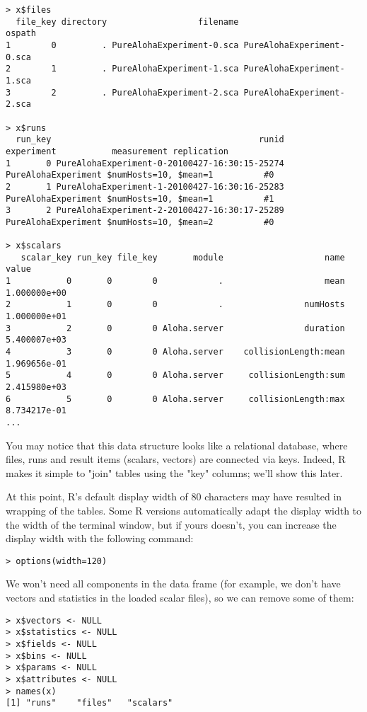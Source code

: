 \begin{verbatim}
> x$files
  file_key directory                  filename                    ospath
1        0         . PureAlohaExperiment-0.sca PureAlohaExperiment-0.sca
2        1         . PureAlohaExperiment-1.sca PureAlohaExperiment-1.sca
3        2         . PureAlohaExperiment-2.sca PureAlohaExperiment-2.sca

> x$runs
  run_key                                         runid          experiment           measurement replication
1       0 PureAlohaExperiment-0-20100427-16:30:15-25274 PureAlohaExperiment $numHosts=10, $mean=1          #0
2       1 PureAlohaExperiment-1-20100427-16:30:16-25283 PureAlohaExperiment $numHosts=10, $mean=1          #1
3       2 PureAlohaExperiment-2-20100427-16:30:17-25289 PureAlohaExperiment $numHosts=10, $mean=2          #0

> x$scalars
   scalar_key run_key file_key       module                    name        value
1           0       0        0            .                    mean 1.000000e+00
2           1       0        0            .                numHosts 1.000000e+01
3           2       0        0 Aloha.server                duration 5.400007e+03
4           3       0        0 Aloha.server    collisionLength:mean 1.969656e-01
5           4       0        0 Aloha.server     collisionLength:sum 2.415980e+03
6           5       0        0 Aloha.server     collisionLength:max 8.734217e-01
...
\end{verbatim}

You may notice that this data structure looks like a relational database, where
files, runs and result items (scalars, vectors) are connected via keys. Indeed,
R makes it simple to "join" tables using the "key" columns; we'll show this later.

At this point, R's default display width of 80 characters may have resulted in wrapping
of the tables. Some R versions automatically adapt the display width to the width of the
terminal window, but if yours doesn't, you can increase the display width with the
following command:

\begin{verbatim}
> options(width=120)
\end{verbatim}

We won't need all components in the data frame (for example, we don't have vectors 
and statistics in the loaded scalar files), so we can remove some of them:
 
\begin{verbatim}
> x$vectors <- NULL
> x$statistics <- NULL
> x$fields <- NULL
> x$bins <- NULL
> x$params <- NULL
> x$attributes <- NULL
> names(x)
[1] "runs"    "files"   "scalars"
\end{verbatim}

